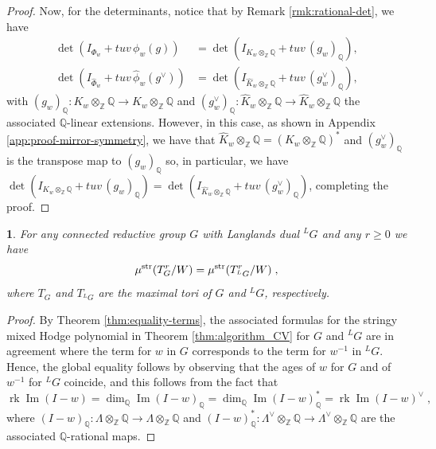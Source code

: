 \documentclass[11pt,english]{amsart}
\numberwithin{equation}{section}
\numberwithin{figure}{section}
\theoremstyle{plain}
\newtheorem{cor}[thm]{\protect\corollaryname}
\theoremstyle{plain}
\theoremstyle{definition}
\theoremstyle{remark}
\DeclareMathOperator{\image}{Im}
\newcommand{\ZZ}{\mathbb{Z}}
\newcommand{\QQ}{\mathbb{Q}}
\newcommand{\rk}{\operatorname{rk}}
\newcommand{\str}{\textup{str}}
\providecommand{\corollaryname}{Corollary}
\begin{document}
\begin{proof}
Now, for the determinants, notice that by Remark \ref{rmk:rational-det}, we have 
\begin{align*}
\det\left(I_{\Phi_w} + tuv\,\phi_w(g)\right) &= \det\left(I_{K_{w} \otimes_\ZZ \QQ} + tuv\,(g_{w})_\QQ\right), \\
\det\left(I_{\hat{\Phi}_{w}} + tuv\,\hat{\phi}_w(g^\vee)\right) &= \det\left(I_{\hat{K}_{w} \otimes_\ZZ \QQ} + tuv\,(g_{w}^\vee)_\QQ\right),
\end{align*}
with $(g_w)_\QQ: K_w \otimes_\ZZ \QQ \to K_w \otimes_\ZZ \QQ $ and $(g_w^\vee)_\QQ: \hat{K}_w \otimes_\ZZ \QQ \to \hat{K}_w \otimes_\ZZ \QQ$ the associated $\QQ$-linear extensions. However, in this case, as shown in Appendix \ref{app:proof-mirror-symmetry}, we have that $\hat{K}_w \otimes_\ZZ \QQ = (K_w \otimes_\ZZ \QQ)^*$ and $(g_w^\vee)_\QQ$ is the transpose map to $(g_w)_\QQ$ so, in particular, we have $\det(I_{K_{w} \otimes_\ZZ \QQ} + tuv\,(g_{w})_\QQ) = \det(I_{\hat{K}_{w} \otimes_\ZZ \QQ} + tuv\,(g_{w}^\vee)_\QQ)$, completing the proof.
\end{proof}

\begin{cor}\label{cor:mirror-symmetry-CV}
For any connected reductive group $G$ with Langlands dual $^LG$ and any $r \geq 0$ we have 
$$
\mu^{\str}(T_G^r/W) = \mu^{\str}(T_{^LG}^r/W)\; ,
$$
where $T_G$ and $T_{^LG}$ are the maximal tori of $G$ and $^LG$, respectively.
\end{cor}

\begin{proof}
    By Theorem \ref{thm:equality-terms}, the associated formulas for the stringy mixed Hodge polynomial in Theorem \ref{thm:algorithm_CV} for $G$ and $^LG$ are in agreement where the term for $w$ in $G$ corresponds to the term for $w^{-1}$ in $^LG$. Hence, the global equality follows by observing that the ages of $w$ for $G$ and of $w^{-1}$ for $^LG$ coincide, and this follows from the fact that
    $$
        \rk \image (I-w) = \dim_\QQ \image (I-w)_\QQ =  \dim_\QQ \image (I-w)^*_\QQ  = \rk \image (I-w)^\vee\; ,
    $$
    where $(I-w)_\QQ: \Lambda \otimes_\ZZ \QQ \to \Lambda \otimes_\ZZ \QQ$ and $(I-w)_\QQ^*: \Lambda^\vee \otimes_\ZZ \QQ \to \Lambda^\vee \otimes_\ZZ \QQ$ are the associated $\QQ$-rational maps.
\end{proof}
\end{document}
